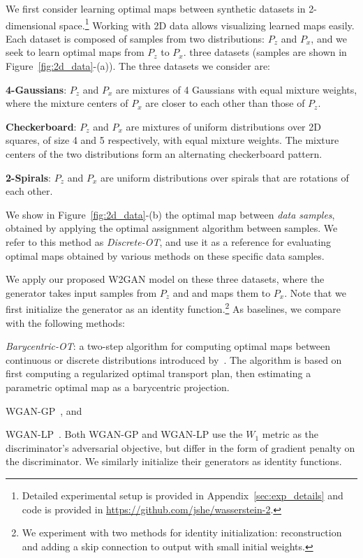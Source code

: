 \documentclass[runningheads]{llncs}
\newcommand\mycitet[1]{\cite{#1}}
\begin{document}
We first consider learning optimal maps between synthetic datasets in 2-dimensional space.\footnote{Detailed experimental setup is provided in Appendix~\ref{sec:exp_details} and code is provided in \url{https://github.com/jshe/wasserstein-2}.} Working with 2D data allows visualizing learned maps easily. Each
dataset is composed of samples from two distributions: $P_z$ and $P_x$, and we seek to learn optimal maps from $P_z$ to $P_x$. 
three datasets (samples are shown in Figure~\ref{fig:2d_data}-(a)). The three datasets we consider are:
\begin{inlinelist}
\item \textbf{4-Gaussians}: $P_z$ and $P_x$ are mixtures of 4 Gaussians with equal mixture weights, where the mixture centers of $P_x$ are closer to each other than those of $P_z$.
\item \textbf{Checkerboard}: $P_z$ and $P_x$ are mixtures of uniform distributions over 2D squares, of size 4 and 5 respectively, with equal mixture weights. The mixture centers of the two distributions form an alternating checkerboard pattern.
\item \textbf{2-Spirals}: $P_z$ and $P_x$ are uniform distributions over spirals that are rotations of each other.
\end{inlinelist}
We show in Figure~\ref{fig:2d_data}-(b) the optimal map between \emph{data samples}, obtained by applying the optimal assignment algorithm between samples. We refer to this method as \textit{Discrete-OT}, and use it as a reference for evaluating optimal maps obtained by various methods on these specific data samples.

We apply our proposed W2GAN model on these three datasets, where the generator takes input samples from $P_z$ and and maps them to $P_x$. Note that we first initialize the generator as an identity function.\footnote{We experiment with two methods for identity initialization: reconstruction and adding a skip connection to output with small initial weights.} %
As baselines, we compare with the following methods:
\begin{inlinelist}
\item \textit{Barycentric-OT}: a two-step algorithm for computing optimal maps between continuous or discrete distributions introduced by~\mycitet{Seguy2018LSOT}. The algorithm is based on first computing a regularized optimal transport
plan, then estimating a parametric optimal map as a barycentric projection.
\item WGAN-GP~\citep{gulrajani2017improved}, and
\item WGAN-LP~\citep{petzka2018on}. Both WGAN-GP and WGAN-LP use the $W_1$ metric as the discriminator's adversarial objective, but differ in the form of gradient penalty on the discriminator. We similarly initialize their generators as identity functions.
\end{inlinelist}
\end{document}
